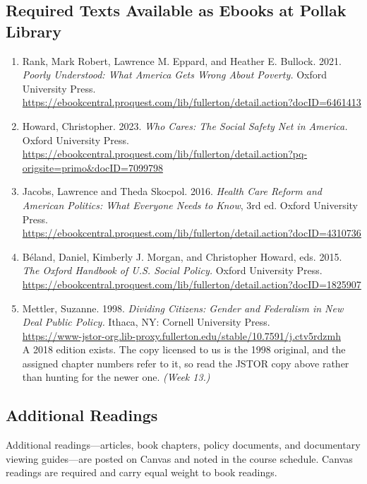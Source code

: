 \documentclass[12pt]{article}
\begin{document}
\subsection*{Required Texts Available as Ebooks at Pollak Library}

\begin{enumerate}
    \item Rank, Mark Robert, Lawrence M. Eppard, and Heather E. Bullock. 2021. \emph{Poorly Understood: What America Gets Wrong About Poverty.} Oxford University Press. \\ \url{https://ebookcentral.proquest.com/lib/fullerton/detail.action?docID=6461413}
    \item Howard, Christopher. 2023. \emph{Who Cares: The Social Safety Net in America.} Oxford University Press. \\ \url{https://ebookcentral.proquest.com/lib/fullerton/detail.action?pq-origsite=primo&docID=7099798}
    \item Jacobs, Lawrence and Theda Skocpol. 2016. \emph{Health Care Reform and American Politics: What Everyone Needs to Know}, 3rd ed. Oxford University Press. \\ \url{https://ebookcentral.proquest.com/lib/fullerton/detail.action?docID=4310736}
    \item Béland, Daniel, Kimberly J. Morgan, and Christopher Howard, eds. 2015. \emph{The Oxford Handbook of U.S. Social Policy.} Oxford University Press. \\ \url{https://ebookcentral.proquest.com/lib/fullerton/detail.action?docID=1825907}
    \item Mettler, Suzanne. 1998. \emph{Dividing Citizens: Gender and Federalism in New Deal Public Policy.} Ithaca, NY: Cornell University Press. \\ \url{https://www-jstor-org.lib-proxy.fullerton.edu/stable/10.7591/j.ctv5rdzmh} \\ A 2018 edition exists. The copy licensed to us is the 1998 original, and the assigned chapter numbers refer to it, so read the JSTOR copy above rather than hunting for the newer one. \emph{(Week 13.)}
\end{enumerate}

\subsection*{Additional Readings}

Additional readings---articles, book chapters, policy documents, and documentary viewing guides---are posted on Canvas and noted in the course schedule. Canvas readings are required and carry equal weight to book readings.
\end{document}
